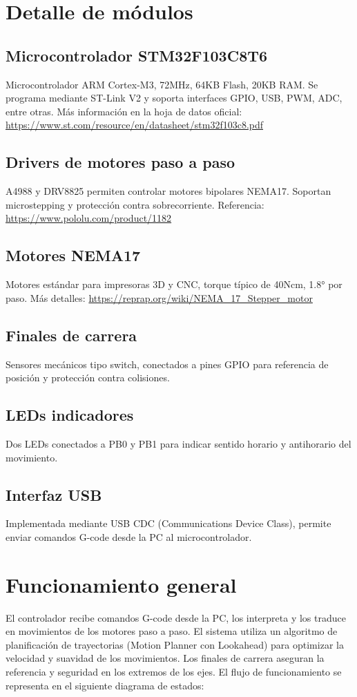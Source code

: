 \documentclass[a4paper,12pt]{article}
\begin{document}
\section{Detalle de módulos}
\subsection{Microcontrolador STM32F103C8T6}
Microcontrolador ARM Cortex-M3, 72MHz, 64KB Flash, 20KB RAM. Se programa mediante ST-Link V2 y soporta interfaces GPIO, USB, PWM, ADC, entre otras. Más información en la hoja de datos oficial: \url{https://www.st.com/resource/en/datasheet/stm32f103c8.pdf}

\subsection{Drivers de motores paso a paso}
A4988 y DRV8825 permiten controlar motores bipolares NEMA17. Soportan microstepping y protección contra sobrecorriente. Referencia: \url{https://www.pololu.com/product/1182}

\subsection{Motores NEMA17}
Motores estándar para impresoras 3D y CNC, torque típico de 40Ncm, 1.8° por paso. Más detalles: \url{https://reprap.org/wiki/NEMA_17_Stepper_motor}

\subsection{Finales de carrera}
Sensores mecánicos tipo switch, conectados a pines GPIO para referencia de posición y protección contra colisiones.

\subsection{LEDs indicadores}
Dos LEDs conectados a PB0 y PB1 para indicar sentido horario y antihorario del movimiento.

\subsection{Interfaz USB}
Implementada mediante USB CDC (Communications Device Class), permite enviar comandos G-code desde la PC al microcontrolador.

\section{Funcionamiento general}
El controlador recibe comandos G-code desde la PC, los interpreta y los traduce en movimientos de los motores paso a paso. El sistema utiliza un algoritmo de planificación de trayectorias (Motion Planner con Lookahead) para optimizar la velocidad y suavidad de los movimientos. Los finales de carrera aseguran la referencia y seguridad en los extremos de los ejes. El flujo de funcionamiento se representa en el siguiente diagrama de estados:
\end{document}
